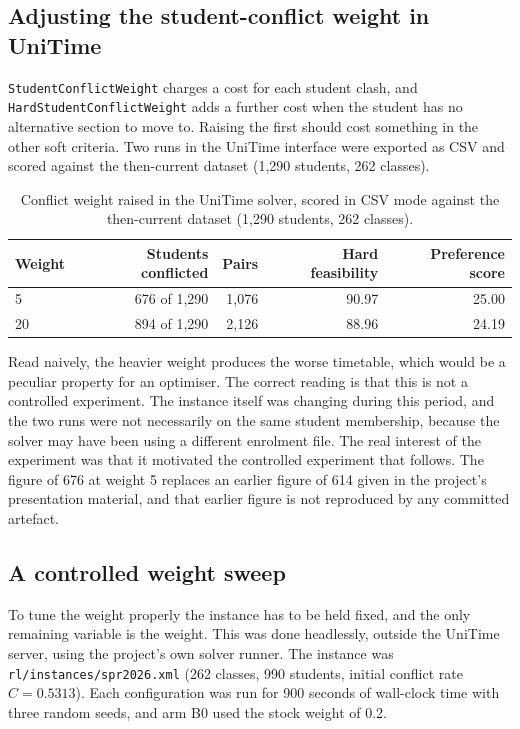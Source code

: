 \subsection{Adjusting the student-conflict weight in UniTime}

\texttt{StudentConflictWeight} charges a cost for each student clash, and
\texttt{HardStudentConflictWeight} adds a further cost when the student has no alternative section
to move to. Raising the first should cost something in the other soft criteria. Two runs in the
UniTime interface were exported as CSV and scored against the then-current dataset (1{,}290
students, 262 classes).

\begin{table}[H]
\centering
\caption{Conflict weight raised in the UniTime solver, scored in CSV mode against the then-current
dataset (1{,}290 students, 262 classes).}
\label{tab:weightcsv}
\footnotesize
\begin{tabular}{@{}lrrrr@{}}
\toprule
\textbf{Weight} & \textbf{Students conflicted} & \textbf{Pairs} & \textbf{Hard feasibility} & \textbf{Preference score} \\
\midrule
5  & 676 of 1{,}290 & 1{,}076 & 90.97 & 25.00 \\
20 & 894 of 1{,}290 & 2{,}126 & 88.96 & 24.19 \\
\bottomrule
\end{tabular}
\end{table}

Read naively, the heavier weight produces the worse timetable, which would be a peculiar property
for an optimiser. The correct reading is that this is not a controlled experiment. The instance
itself was changing during this period, and the two runs were not necessarily on the same student
membership, because the solver may have been using a different enrolment file. The real interest
of the experiment was that it motivated the controlled experiment that follows. The figure of 676
at weight 5 replaces an earlier figure of 614 given in the project's presentation material, and
that earlier figure is not reproduced by any committed artefact.

\subsection{A controlled weight sweep}

To tune the weight properly the instance has to be held fixed, and the only remaining variable is
the weight. This was done headlessly, outside the UniTime server, using the project's own solver
runner. The instance was \texttt{rl/instances/spr2026.xml} (262 classes, 990 students, initial
conflict rate $C = 0.5313$). Each configuration was run for 900 seconds of wall-clock time with
three random seeds, and arm B0 used the stock weight of 0.2.


